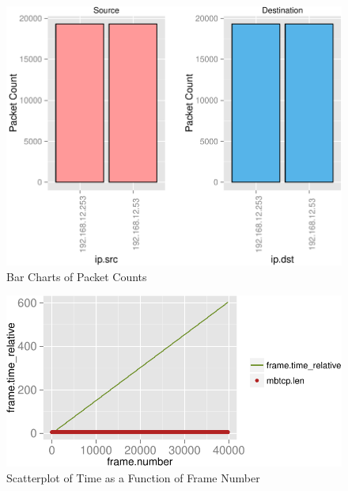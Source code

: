 \documentclass[11pt,a4paper]{article}
\begin{document}
\clearpage

\begin{figure}[h]

{\centering \includegraphics{thesis_files/figure-latex/unnamed-chunk-24-1} 

}

\caption{Bar Charts of Packet Counts}\label{fig:unnamed-chunk-24}
\end{figure}

\begin{figure}[h]

{\centering \includegraphics{thesis_files/figure-latex/unnamed-chunk-26-1} 

}

\caption{Scatterplot of Time as a Function of Frame Number}\label{fig:unnamed-chunk-26}
\end{figure}
\end{document}
